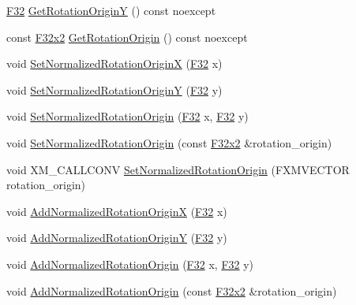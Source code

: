 \begin{DoxyCompactItemize}
\item 
\hyperlink{namespacemage_aa97e833b45f06d60a0a9c4fc22ae02c0}{F32} \hyperlink{classmage_1_1_sprite_transform_a762326097353f1303eede1b716cb9f51}{Get\+Rotation\+OriginY} () const noexcept
\item 
const \hyperlink{namespacemage_aa87237ad091f5cd7da612b8523fc108f}{F32x2} \hyperlink{classmage_1_1_sprite_transform_a5c538636df465016643a370a9f820865}{Get\+Rotation\+Origin} () const noexcept
\item 
void \hyperlink{classmage_1_1_sprite_transform_a01087d541331e849727c7b8d338bab6e}{Set\+Normalized\+Rotation\+OriginX} (\hyperlink{namespacemage_aa97e833b45f06d60a0a9c4fc22ae02c0}{F32} x)
\item 
void \hyperlink{classmage_1_1_sprite_transform_ab940629ca5a67e28fa470800bcef705d}{Set\+Normalized\+Rotation\+OriginY} (\hyperlink{namespacemage_aa97e833b45f06d60a0a9c4fc22ae02c0}{F32} y)
\item 
void \hyperlink{classmage_1_1_sprite_transform_aeab79024ac1941d9865a202258238dfe}{Set\+Normalized\+Rotation\+Origin} (\hyperlink{namespacemage_aa97e833b45f06d60a0a9c4fc22ae02c0}{F32} x, \hyperlink{namespacemage_aa97e833b45f06d60a0a9c4fc22ae02c0}{F32} y)
\item 
void \hyperlink{classmage_1_1_sprite_transform_a9b0a175e57dc433b00f46a4c637a29c0}{Set\+Normalized\+Rotation\+Origin} (const \hyperlink{namespacemage_aa87237ad091f5cd7da612b8523fc108f}{F32x2} \&rotation\+\_\+origin)
\item 
void X\+M\+\_\+\+C\+A\+L\+L\+C\+O\+NV \hyperlink{classmage_1_1_sprite_transform_a820e4d9bcfaf0a66b325c5229c06de78}{Set\+Normalized\+Rotation\+Origin} (F\+X\+M\+V\+E\+C\+T\+OR rotation\+\_\+origin)
\item 
void \hyperlink{classmage_1_1_sprite_transform_a005c488bb8601f0defe11b3496a4a838}{Add\+Normalized\+Rotation\+OriginX} (\hyperlink{namespacemage_aa97e833b45f06d60a0a9c4fc22ae02c0}{F32} x)
\item 
void \hyperlink{classmage_1_1_sprite_transform_a322c799c3cc72ac44dbc1a2ed1234a67}{Add\+Normalized\+Rotation\+OriginY} (\hyperlink{namespacemage_aa97e833b45f06d60a0a9c4fc22ae02c0}{F32} y)
\item 
void \hyperlink{classmage_1_1_sprite_transform_af5b99182b93907b946df86a30bdf9e9b}{Add\+Normalized\+Rotation\+Origin} (\hyperlink{namespacemage_aa97e833b45f06d60a0a9c4fc22ae02c0}{F32} x, \hyperlink{namespacemage_aa97e833b45f06d60a0a9c4fc22ae02c0}{F32} y)
\item 
void \hyperlink{classmage_1_1_sprite_transform_a87802e7ff3729b032ad77a9fa701d8a3}{Add\+Normalized\+Rotation\+Origin} (const \hyperlink{namespacemage_aa87237ad091f5cd7da612b8523fc108f}{F32x2} \&rotation\+\_\+origin)

\end{DoxyCompactItemize}
